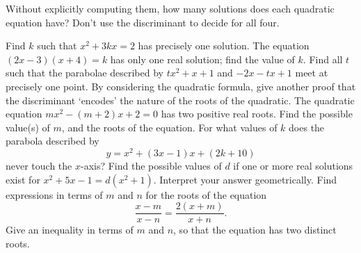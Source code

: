 \begin{questions}
  \question Without explicitly computing them, how many solutions does each quadratic equation have? Don't use the discriminant
            to decide for all four.
  \question Find $ k $ such that $ x^2 + 3kx = 2 $ has precisely one solution.
  \question The equation $ (2x - 3)(x + 4) = k $ has only one real solution; find the value of $ k $.
  \question Find all $ t $ such that the parabolae described by $ tx^2 + x + 1 $ and $ -2x - tx + 1 $ meet at precisely one point.
  \question By considering the quadratic formula, give another proof that the discriminant `encodes' the nature of the roots of the quadratic.
  \question The quadratic equation $ mx^2 - (m + 2)x + 2 = 0 $ has two positive real roots. Find the possible
            value(s) of $ m $, and the roots of the equation.
  \question For what values of $ k $ does the parabola described by
            \begin{displaymath}
              y = x^2 + (3x - 1)x + (2k + 10)
            \end{displaymath}
            never touch the $x$-axis?
  \question Find the possible values of $ d $ if one or more real solutions exist for $ x^2 + 5x - 1 = d(x^2 + 1) $. Interpret
            your answer geometrically.
  \question Find expressions in terms of $ m $ and $ n $ for the roots of the equation
            \begin{displaymath}
              \frac{x - m}{x - n} = \frac{2(x + m)}{x + n}.
            \end{displaymath}
            Give an inequality in terms of $ m $ and $ n $, so that the equation has two distinct roots.
\end{questions}


